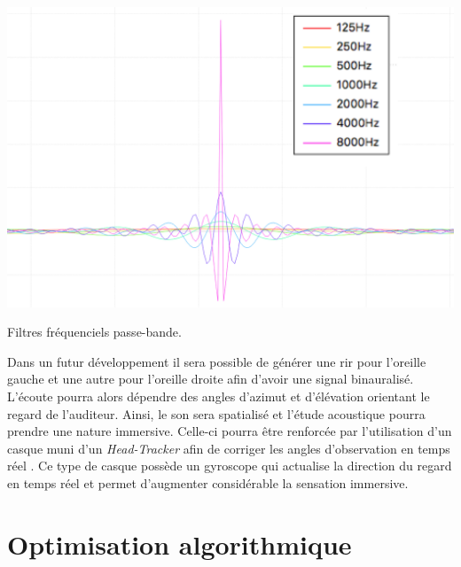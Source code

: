 \begin{figureth}
	\includegraphics[width=0.9\linewidth]{images/filtres}
	\caption{Filtres fréquenciels passe-bande.}
	\label{filtres}
\end{figureth}

Dans un futur développement il sera possible de générer une \gls{rir} pour l'oreille gauche et une autre pour l'oreille droite afin d'avoir une signal binauralisé. L'écoute pourra alors dépendre des angles d'azimut et d'élévation orientant le regard de l'auditeur. Ainsi, le son sera spatialisé et l'étude acoustique pourra prendre une nature immersive. Celle-ci pourra être renforcée par l'utilisation d'un casque muni d'un \textit{Head-Tracker} afin de corriger les angles d'observation en temps réel \cite{myBino}. Ce type de casque possède un gyroscope qui actualise la direction du regard en temps réel et permet d'augmenter considérable la sensation immersive. 

%






\chapter{Optimisation algorithmique}
	\minitoc
	\newpage
	
\label{sect_complexite}

